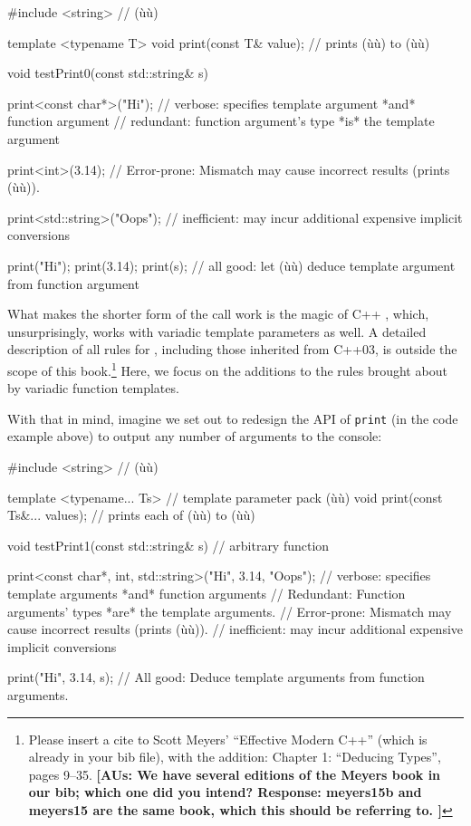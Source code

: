 \begin{emcppslisting}
#include <string>  // (ù{}ù)

template <typename T> void print(const T& value);  // prints (ù{}ù) to (ù{}ù)

void testPrint0(const std::string& s)
{
    print<const char*>("Hi");
        // verbose:   specifies template argument *and* function argument
        // redundant: function argument's type *is* the template argument

    print<int>(3.14);
        // Error-prone: Mismatch may cause incorrect results (prints (ù{}ù)).

    print<std::string>("Oops");
        // inefficient: may incur additional expensive implicit conversions

    print("Hi");
    print(3.14);
    print(s);
        // all good: let (ù{}ù) deduce template argument from function argument
}
\end{emcppslisting}
    

\noindent What makes the shorter form of the call work is the magic of C++
, which, unsurprisingly, works with
variadic template parameters as well. A detailed description of all
rules for , including those
inherited from C++03, is outside the scope of this
book.\footnote{Please insert a cite to Scott Meyers'
``Effective Modern C++'' (which is already in your bib file), with the
addition: Chapter 1: ``Deducing Types'', pages 9--35. \textbf{[AUs: We have several editions of the Meyers book in our bib; which one did you intend?  Response: meyers15b and meyers15 are the same book, which this should be referring to.  ]}} Here, we focus on the additions to the
rules brought about by variadic function templates.

With that in mind, imagine we set out to redesign the API of
\lstinline!print! (in the code example above) to output any number of
arguments to the console:

\begin{emcppslisting}[emcppsbatch=e16]
#include <string>  // (ù{}ù)

template <typename... Ts>                // template parameter pack (ù{}ù)
void print(const Ts&... values);         // prints each of (ù{}ù) to (ù{}ù)

void testPrint1(const std::string& s)  // arbitrary function
{
    print<const char*, int, std::string>("Hi", 3.14, "Oops");
        // verbose:     specifies template arguments *and* function arguments
        // Redundant:   Function arguments' types *are* the template arguments.
        // Error-prone: Mismatch may cause incorrect results (prints (ù{}ù)).
        // inefficient: may incur additional expensive implicit conversions

    print("Hi", 3.14, s);
        // All good: Deduce template arguments from function arguments.
}
\end{emcppslisting}
    

